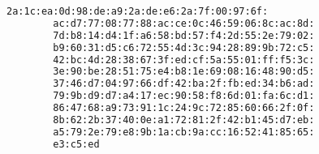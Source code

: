 \begin{lstlisting}[language=bash, caption=Elements in the RSA algorithm,
    label={lst:rsa_element}]
        2a:1c:ea:0d:98:de:a9:2a:de:e6:2a:7f:00:97:6f: 
        ac:d7:77:08:77:88:ac:ce:0c:46:59:06:8c:ac:8d: 
        7d:b8:14:d4:1f:a6:58:bd:57:f4:2d:55:2e:79:02: 
        b9:60:31:d5:c6:72:55:4d:3c:94:28:89:9b:72:c5: 
        42:bc:4d:28:38:67:3f:ed:cf:5a:55:01:ff:f5:3c: 
        3e:90:be:28:51:75:e4:b8:1e:69:08:16:48:90:d5: 
        37:46:d7:04:97:66:df:42:ba:2f:fb:ed:34:b6:ad: 
        79:9b:d9:d7:a4:17:ec:90:58:f8:6d:01:fa:6c:d1: 
        86:47:68:a9:73:91:1c:24:9c:72:85:60:66:2f:0f: 
        8b:62:2b:37:40:0e:a1:72:81:2f:42:b1:45:d7:eb: 
        a5:79:2e:79:e8:9b:1a:cb:9a:cc:16:52:41:85:65: 
        e3:c5:ed     
\end{lstlisting}